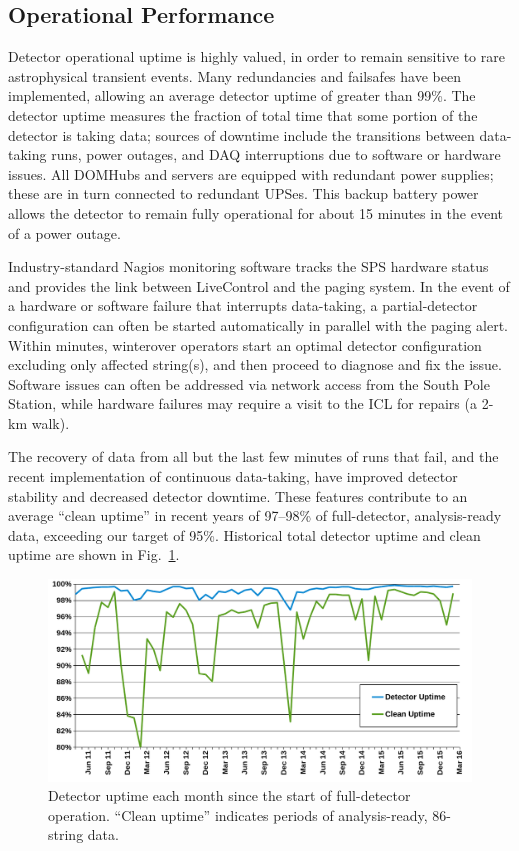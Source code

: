 \subsection{\label{sec:operational_performance}Operational Performance}

Detector operational uptime is highly valued, in order to remain
sensitive to rare astrophysical transient events.  Many redundancies and
failsafes have been implemented, allowing an average detector uptime of greater
than 99\%. The detector uptime measures the fraction of total time
that some portion of the detector is taking data; sources of downtime
include the transitions between data-taking runs, power outages, and
DAQ interruptions due to software or hardware issues. All DOMHubs and servers are equipped with redundant power
supplies; these are in turn connected to redundant UPSes. This backup battery
power allows the detector to remain fully operational for about 15 minutes in the
event of a power outage.

Industry-standard Nagios monitoring software tracks the SPS hardware status and provides the link
between LiveControl and the paging system.  In the event of a hardware
or software failure that interrupts data-taking, a partial-detector configuration can
often be started automatically in parallel with the paging alert.
Within minutes, winterover operators start an optimal detector configuration
excluding only affected string(s), and then proceed to diagnose and fix the
issue.  Software issues can often be addressed via network access from the
South Pole Station, while hardware failures may require a visit to the ICL
for repairs (a 2-km walk).

The recovery of data from all but the last few minutes of runs that fail,
and the recent implementation of continuous data-taking, have improved
detector stability and decreased detector downtime. These features
contribute to an average ``clean uptime'' in recent years of 97--98\% of
full-detector, analysis-ready data, exceeding our target of 95\%.
Historical total detector uptime and clean uptime are shown in
Fig.~\ref{fig:clean-uptime}.   

\begin{figure}[!ht]
 \centering
 \includegraphics[width=1.0\textwidth]{graphics/uptime/clean-uptime.png}
 \caption{Detector uptime each month since the start of full-detector
   operation. ``Clean uptime'' indicates periods of analysis-ready,
   86-string data.} 
 \label{fig:clean-uptime}
\end{figure}


